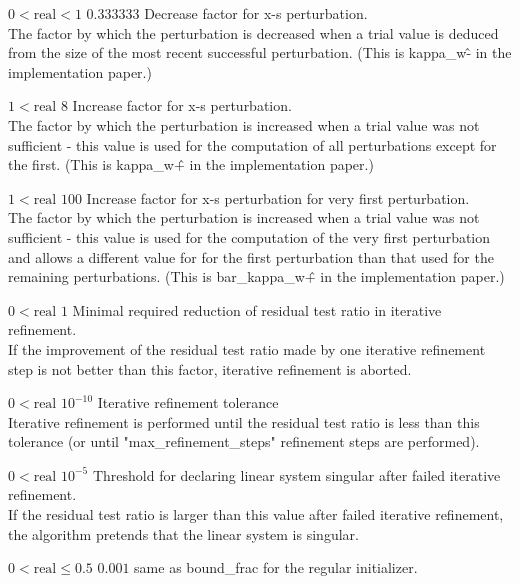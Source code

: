%
{$0<\textrm{real}<1$}%
{$0.333333$}%
{Decrease factor for x-s perturbation.\\
The factor by which the perturbation is decreased when a trial value is deduced from the size of the most recent successful perturbation. (This is kappa\_w\^- in the implementation paper.)}%
{}

%
{$1<\textrm{real}$}%
{$8$}%
{Increase factor for x-s perturbation.\\
The factor by which the perturbation is increased when a trial value was not sufficient - this value is used for the computation of all perturbations except for the first. (This is kappa\_w\^+ in the implementation paper.)}%
{}

%
{$1<\textrm{real}$}%
{$100$}%
{Increase factor for x-s perturbation for very first perturbation.\\
The factor by which the perturbation is increased when a trial value was not sufficient - this value is used for the computation of the very first perturbation and allows a different value for for the first perturbation than that used for the remaining perturbations. (This is bar\_kappa\_w\^+ in the implementation paper.)}%
{}

%
{$0<\textrm{real}$}%
{$1$}%
{Minimal required reduction of residual test ratio in iterative refinement.\\
If the improvement of the residual test ratio made by one iterative refinement step is not better than this factor, iterative refinement is aborted.}%
{}

%
{$0<\textrm{real}$}%
{$10^{-10}$}%
{Iterative refinement tolerance\\
Iterative refinement is performed until the residual test ratio is less than this tolerance (or until "max\_refinement\_steps" refinement steps are performed).}%
{}

%
{$0<\textrm{real}$}%
{$10^{- 5}$}%
{Threshold for declaring linear system singular after failed iterative refinement.\\
If the residual test ratio is larger than this value after failed iterative refinement, the algorithm pretends that the linear system is singular.}%
{}

%
{$0<\textrm{real}\leq0.5$}%
{$0.001$}%
{same as bound\_frac for the regular initializer.}%
{}

